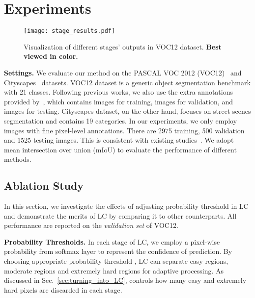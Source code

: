 \documentclass[10pt,twocolumn,letterpaper]{article}
\begin{document}
 

\section{Experiments}
\label{sec:experiments}


\begin{figure}
    \centering
    \texttt{[image: stage\_results.pdf]}
    \caption{\small{Visualization of different stages' outputs in VOC12 dataset. \textbf{Best viewed in color.}}}
    \label{fig:stage_results}
    \vspace{-12pt}
\end{figure}

\noindent
\textbf{Settings.} 
We evaluate our method on the PASCAL VOC 2012 (VOC12)~\cite{everingham2010pascal} and Cityscapes~\cite{Cordts2016Cityscapes} datasets.
VOC12 dataset is a generic object segmentation benchmark with 21 classes.
Following previous works, we also use the extra annotations provided by~\cite{hariharan2011semantic}, which contains  images for training,  images for validation, and  images for testing. 
Cityscapes dataset, on the other hand, focuses on street scenes segmentation and contains 19 categories.
In our experiments, we only employ images with fine pixel-level annotations. There are 2975 training, 500 validation and 1525 testing images. This is consistent with existing studies~\cite{lin2015efficient, CP2016Deeplab}.
We adopt mean intersection over union (mIoU) to evaluate the performance of different methods. 

\subsection{Ablation Study}
\label{sec:effectiveness}




In this section, we investigate the effects of adjusting probability threshold in LC and demonstrate the merits of LC by comparing it to other counterparts.
All performance are reported on the \emph{validation set} of VOC12.

\noindent
\textbf{Probability Thresholds.}
In each stage of LC, we employ a pixel-wise probability from softmax layer to represent the confidence of prediction.
By choosing appropriate probability threshold , LC can separate easy regions, moderate regions and extremely hard regions for adaptive processing.
As discussed in Sec.~\ref{sec:turning_into_LC},  controls how many easy and extremely hard pixels are discarded in each stage.
\end{document}
